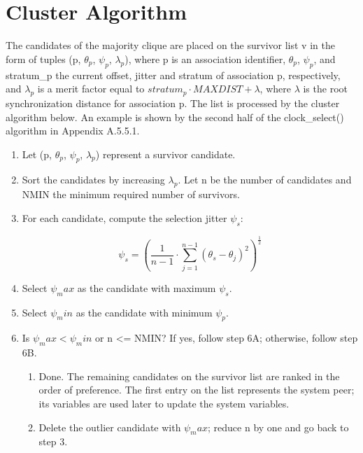 \section{Cluster Algorithm}

The candidates of the majority clique are placed on the survivor list
v in the form of tuples (p, $ \theta_p $, $ \psi_p $, $ \lambda_p $), where p is an
association identifier, $ \theta_p $, $ \psi_p $, and stratum\_p the current
offset, jitter and stratum of association p, respectively, and
$ \lambda_p $ is a merit factor equal to $ stratum_p \cdot MAXDIST + \lambda $,
where $ \lambda $ is the root synchronization distance for association p.
The list is processed by the cluster algorithm below.  An example is
shown by the second half of the clock\_select() algorithm in
Appendix A.5.5.1.

\begin{enumerate}
  \item Let (p, $ \theta_p $, $ \psi_p $, $ \lambda_p $) represent a survivor candidate.

  \item Sort the candidates by increasing $ \lambda_p $.  Let n be the number
    of candidates and NMIN the minimum required number of survivors.

  \item For each candidate, compute the selection jitter $ \psi_s $:

    $$
    \psi_s = \left( \frac{1}{n - 1} \cdot \sum^{n - 1}_{j = 1} (\theta_s - \theta_j)^2 \right)^{\frac{1}{2}}
    $$

  \item Select $ \psi_max $ as the candidate with maximum $ \psi_s $.
  \item Select $ \psi_min $ as the candidate with minimum $ \psi_p $.

  \item Is $ \psi_max < \psi_min $ or n <= NMIN?  If yes, follow step 6A;
    otherwise, follow step 6B.

    \begin{enumerate}[6A.]
      \item Done. The remaining candidates on the survivor list are ranked
      in the order of preference.  The first entry on the list represents
      the system peer; its variables are used later to update the system
      variables.

      \item Delete the outlier candidate with $ \psi_max $; reduce n by one and go
      back to step 3.
    \end{enumerate}
\end{enumerate}


